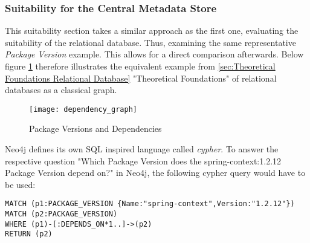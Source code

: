 \subsubsection{Suitability for the Central Metadata Store}
This suitability section takes a similar approach as the first one, evaluating the suitability of the relational database. Thus, examining the same representative \emph{Package Version} example. This allows for a direct comparison afterwards. Below figure \ref{fig:PackageVersionsAndDependenciesGraph} therefore illustrates the equivalent example from \ref{sec:Theoretical Foundations Relational Database} "Theoretical Foundations" of relational databases as a classical graph.

\begin{figure}[H]
	\centering
	\texttt{[image: dependency\_graph]}
	\caption[Package Versions and Dependencies as Graph]{Package Versions and Dependencies }
	\label{fig:PackageVersionsAndDependenciesGraph}
\end{figure}

Neo4j defines its own SQL inspired language called \emph{cypher}. To answer the respective question "Which Package Version does the spring-context:1.2.12 Package Version depend on?" in Neo4j, the following cypher query would have to be used:

\begin{lstlisting}[caption=Package Version Dependencies (including transitive), captionpos=b, label=lst:CypherTransitive]
MATCH (p1:PACKAGE_VERSION {Name:"spring-context",Version:"1.2.12"})
MATCH (p2:PACKAGE_VERSION)
WHERE (p1)-[:DEPENDS_ON*1..]->(p2)
RETURN (p2)
\end{lstlisting}

